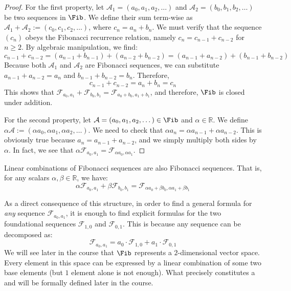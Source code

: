 \begin{proof}
For the first property, let $\mathcal{A}_1 = (a_0, a_1, a_2, \dots)$ and $\mathcal{A}_2 = (b_0, b_1, b_2, \dots)$ be two sequences in $\Fib$. We define their sum term-wise as $\mathcal{A}_1 + \mathcal{A}_2 := (c_0, c_1, c_2, \dots)$, where $c_n = a_n + b_n$. We must verify that the sequence $(c_n)$ obeys the Fibonacci recurrence relation, namely $c_n = c_{n-1} + c_{n-2}$ for $n \ge 2$. By algebraic manipulation, we find:
\[
c_{n-1} + c_{n-2} = (a_{n-1} + b_{n-1}) + (a_{n-2} + b_{n-2}) = (a_{n-1} + a_{n-2}) + (b_{n-1} + b_{n-2})
\]
Because both $\mathcal{A}_1$ and $\mathcal{A}_2$ are Fibonacci sequences, we can substitute $a_{n-1} + a_{n-2} = a_n$ and $b_{n-1} + b_{n-2} = b_n$. Therefore,
\[
c_{n-1} + c_{n-2} = a_n + b_n = c_n
\]
This shows that $\mathcal{F}_{a_0, a_1} + \mathcal{F}_{b_0, b_1} = \mathcal{F}_{a_0 + b_0, a_1 + b_1}$, and therefore, $\Fib$ is closed under addition.

For the second property, let $\mathcal{A} = (a_0, a_1, a_2, \dots) \in \Fib$ and $\alpha \in \mathbb{R}$. We define $\alpha \mathcal{A} := (\alpha a_0, \alpha a_1, \alpha a_2, \dots)$. We need to check that $\alpha a_n = \alpha a_{n-1} + \alpha a_{n-2}$. This is obviously true because $a_n = a_{n-1} + a_{n-2}$, and we simply multiply both sides by $\alpha$. In fact, we see that $\alpha \mathcal{F}_{a_0, a_1} = \mathcal{F}_{\alpha a_0, \alpha a_1}$.
\end{proof}

\begin{corollary}
Linear combinations of Fibonacci sequences are also Fibonacci sequences. That is, for any scalars $\alpha, \beta \in \mathbb{R}$, we have:
\[
\alpha \mathcal{F}_{a_0, a_1} + \beta \mathcal{F}_{b_0, b_1} = \mathcal{F}_{\alpha a_0 + \beta b_0, \alpha a_1 + \beta b_1}
\]
\end{corollary}

\begin{remark}
As a direct consequence of this structure, in order to find a general formula for \textit{any} sequence $\mathcal{F}_{a_0, a_1}$, it is enough to find explicit formulas for the two foundational sequences $\mathcal{F}_{1,0}$ and $\mathcal{F}_{0,1}$. This is because any sequence can be decomposed as:
\[
\mathcal{F}_{a_0, a_1} = a_0 \cdot \mathcal{F}_{1,0} + a_1 \cdot \mathcal{F}_{0,1}
\]
We will see later in the course that $\Fib$ represents a $2$-dimensional vector space. Every element in this space can be expressed by a linear combination of some two base elements (but $1$ element alone is not enough). What precisely constitutes a  and  will be formally defined later in the course.
\end{remark}

